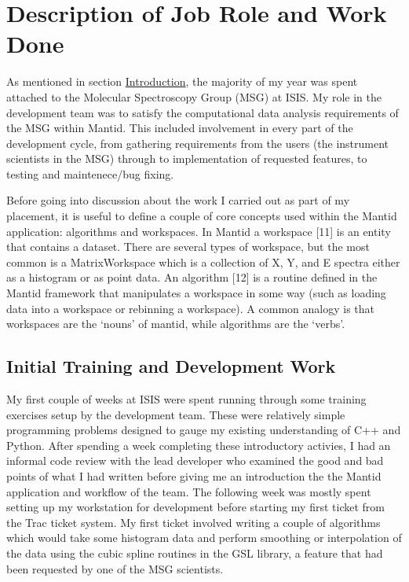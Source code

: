\documentclass[paper=a4, fontsize=11pt]{scrartcl}	%
\numberwithin{equation}{section}															%
\numberwithin{figure}{section}																%
\numberwithin{table}{section}
\begin{document}
\section{Description of Job Role and Work
Done}\label{description-of-job-role-and-work-done}

As mentioned in section \hyperref[introduction]{Introduction}, the
majority of my year was spent attached to the Molecular Spectroscopy
Group (MSG) at ISIS. My role in the development team was to satisfy the
computational data analysis requirements of the MSG within Mantid. This
included involvement in every part of the development cycle, from
gathering requirements from the users (the instrument scientists in the
MSG) through to implementation of requested features, to testing and
maintenece/bug fixing.

Before going into discussion about the work I carried out as part of my
placement, it is useful to define a couple of core concepts used within
the Mantid application: algorithms and workspaces. In Mantid a workspace
{[}11{]} is an entity that contains a dataset. There are several types
of workspace, but the most common is a MatrixWorkspace which is a
collection of X, Y, and E spectra either as a histogram or as point
data. An algorithm {[}12{]} is a routine defined in the Mantid framework
that manipulates a workspace in some way (such as loading data into a
workspace or rebinning a workspace). A common analogy is that workspaces
are the `nouns' of mantid, while algorithms are the `verbs'.

\subsection{Initial Training and Development
Work}\label{initial-training-and-development-work}

My first couple of weeks at ISIS were spent running through some
training exercises setup by the development team. These were relatively
simple programming problems designed to gauge my existing understanding
of C++ and Python. After spending a week completing these introductory
activies, I had an informal code review with the lead developer who
examined the good and bad points of what I had written before giving me
an introduction the the Mantid application and workflow of the team. The
following week was mostly spent setting up my workstation for
development before starting my first ticket from the Trac ticket system.
My first ticket involved writing a couple of algorithms which would take
some histogram data and perform smoothing or interpolation of the data
using the cubic spline routines in the GSL library, a feature that had
been requested by one of the MSG scientists.
\end{document}

